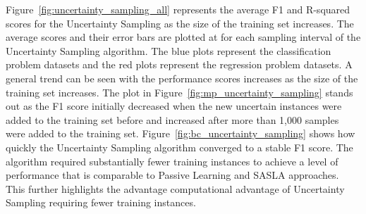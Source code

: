 \documentclass[conference]{IEEEtran}
\begin{document}
	Figure~\ref{fig:uncertainty_sampling_all} represents the average F1 and R-squared scores for the Uncertainty Sampling as the size of the training set increases. The average scores and their error bars are plotted at for each sampling interval of the Uncertainty Sampling algorithm. The blue plots represent the classification problem datasets and the red plots represent the regression problem datasets. A general trend can be seen with the performance scores increases as the size of the training set increases. The plot in Figure~\ref{fig:mp_uncertainty_sampling} stands out as the F1 score initially decreased when the new uncertain instances were added to the training set before and increased after more than 1,000 samples were added to the training set. Figure~\ref{fig:bc_uncertainty_sampling} shows how quickly the Uncertainty Sampling algorithm converged to a stable F1 score. The algorithm required substantially fewer training instances to achieve a level of performance that is comparable to Passive Learning and SASLA approaches. This further highlights the advantage computational advantage of Uncertainty Sampling requiring fewer training instances.
	
\end{document}
